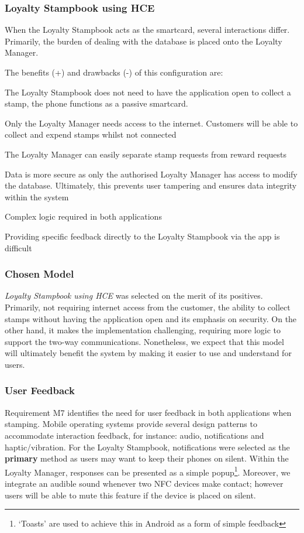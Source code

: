 \subsubsection{Loyalty Stampbook using HCE}
When the Loyalty Stampbook acts as the smartcard, several interactions differ. Primarily, the burden of dealing with the database is placed onto the Loyalty Manager.

The benefits (+) and drawbacks (-) of this configuration are: 
\begin{description}[leftmargin=!,labelwidth=\widthof{\bfseries small}]
    \item[+] The Loyalty Stampbook does not need to have the application open to collect a stamp, the phone functions as a passive smartcard.
    \item[+] Only the Loyalty Manager needs access to the internet. Customers will be able to collect and expend stamps whilst not connected
    \item[+] The Loyalty Manager can easily separate stamp requests from reward requests
    \item[+] Data is more secure as only the authorised Loyalty Manager has access to modify the database. Ultimately, this prevents user tampering and ensures data integrity within the system
    \item[---] Complex logic required in both applications
    \item[---] Providing specific feedback directly to the Loyalty Stampbook via the app is difficult
\end{description}

\subsubsection{Chosen Model}
\emph{Loyalty Stampbook using HCE} was selected on the merit of its positives. Primarily, not requiring internet access from the customer, the ability to collect stamps without having the application open and its emphasis on security. On the other hand, it makes the implementation challenging, requiring more logic to support the two-way communications. Nonetheless, we expect that this model will ultimately benefit the system by making it easier to use and understand for users.

\subsubsection{User Feedback}
\label{sec:userfeedback}
Requirement M7 identifies the need for user feedback in both applications when stamping. Mobile operating systems provide several design patterns to accommodate interaction feedback, for instance: audio, notifications and haptic/vibration. For the Loyalty Stampbook, notifications were selected as the \textbf{primary} method as users may want to keep their phones on silent. Within the Loyalty Manager, responses can be presented as a simple popup\footnote{`Toasts' are used to achieve this in Android as a form of simple feedback}. Moreover, we integrate an audible sound whenever two NFC devices make contact; however users will be able to mute this feature if the device is placed on silent. 

